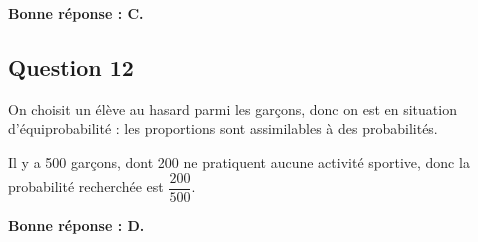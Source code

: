 	\textbf{Bonne réponse : C.}

\subsection*{Question 12}
	On choisit un élève au hasard parmi les garçons, donc on est en situation d'équiprobabilité : les proportions sont assimilables à des probabilités.

	Il y a 500 garçons, dont 200 ne pratiquent aucune activité sportive, donc la probabilité recherchée est \mbox{$\dfrac{200}{500}$}.

	\textbf{Bonne réponse : D.}
